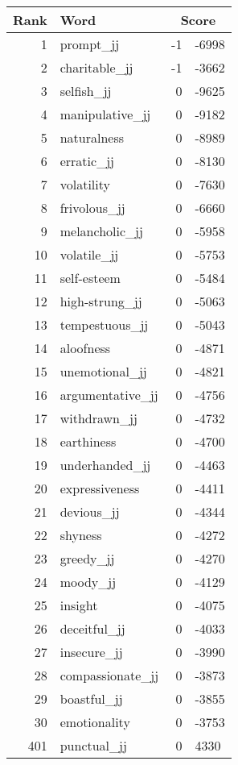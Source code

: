 \begin{longtable}[!htbp]{| rlr@{.}l |}
    \hline
    \textbf{Rank} & \textbf{Word} & \multicolumn{2}{c|}{\textbf{Score}} \\
    \hline
    \endhead
    1 & prompt\_jj & -1 & -6998 \\
    2 & charitable\_jj & -1 & -3662 \\
    3 & selfish\_jj & 0 & -9625 \\
    4 & manipulative\_jj & 0 & -9182 \\
    5 & naturalness & 0 & -8989 \\
    6 & erratic\_jj & 0 & -8130 \\
    7 & volatility & 0 & -7630 \\
    8 & frivolous\_jj & 0 & -6660 \\
    9 & melancholic\_jj & 0 & -5958 \\
    10 & volatile\_jj & 0 & -5753 \\
    11 & self-esteem & 0 & -5484 \\
    12 & high-strung\_jj & 0 & -5063 \\
    13 & tempestuous\_jj & 0 & -5043 \\
    14 & aloofness & 0 & -4871 \\
    15 & unemotional\_jj & 0 & -4821 \\
    16 & argumentative\_jj & 0 & -4756 \\
    17 & withdrawn\_jj & 0 & -4732 \\
    18 & earthiness & 0 & -4700 \\
    19 & underhanded\_jj & 0 & -4463 \\
    20 & expressiveness & 0 & -4411 \\
    21 & devious\_jj & 0 & -4344 \\
    22 & shyness & 0 & -4272 \\
    23 & greedy\_jj & 0 & -4270 \\
    24 & moody\_jj & 0 & -4129 \\
    25 & insight & 0 & -4075 \\
    26 & deceitful\_jj & 0 & -4033 \\
    27 & insecure\_jj & 0 & -3990 \\
    28 & compassionate\_jj & 0 & -3873 \\
    29 & boastful\_jj & 0 & -3855 \\
    30 & emotionality & 0 & -3753 \\
    401 & punctual\_jj & 0 & 4330 \\

\end{longtable}
